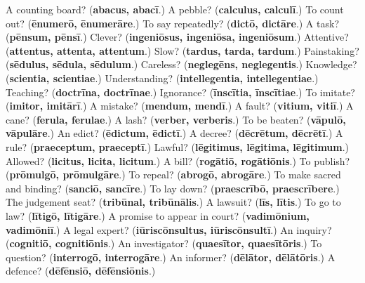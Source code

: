 \begin{tcolorbox}[breakable,colback=teal!4,colframe=teal!35!black,title={Before you move on}]
A counting board? (\textbf{abacus, abacī}.) A pebble? (\textbf{calculus, calculī}.) To count out? (\textbf{ēnumerō, ēnumerāre}.) To say repeatedly? (\textbf{dictō, dictāre}.) A task? (\textbf{pēnsum, pēnsī}.) Clever? (\textbf{ingeniōsus, ingeniōsa, ingeniōsum}.) Attentive? (\textbf{attentus, attenta, attentum}.) Slow? (\textbf{tardus, tarda, tardum}.) Painstaking? (\textbf{sēdulus, sēdula, sēdulum}.) Careless? (\textbf{neglegēns, neglegentis}.) Knowledge? (\textbf{scientia, scientiae}.) Understanding? (\textbf{intellegentia, intellegentiae}.) Teaching? (\textbf{doctrīna, doctrīnae}.) Ignorance? (\textbf{īnscītia, īnscītiae}.) To imitate? (\textbf{imitor, imitārī}.) A mistake? (\textbf{mendum, mendī}.) A fault? (\textbf{vitium, vitiī}.) A cane? (\textbf{ferula, ferulae}.) A lash? (\textbf{verber, verberis}.) To be beaten? (\textbf{vāpulō, vāpulāre}.) An edict? (\textbf{ēdictum, ēdictī}.) A decree? (\textbf{dēcrētum, dēcrētī}.) A rule? (\textbf{praeceptum, praeceptī}.) Lawful? (\textbf{lēgitimus, lēgitima, lēgitimum}.) Allowed? (\textbf{licitus, licita, licitum}.) A bill? (\textbf{rogātiō, rogātiōnis}.) To publish? (\textbf{prōmulgō, prōmulgāre}.) To repeal? (\textbf{abrogō, abrogāre}.) To make sacred and binding? (\textbf{sanciō, sancīre}.) To lay down? (\textbf{praescrībō, praescrībere}.) The judgement seat? (\textbf{tribūnal, tribūnālis}.) A lawsuit? (\textbf{līs, lītis}.) To go to law? (\textbf{lītigō, lītigāre}.) A promise to appear in court? (\textbf{vadimōnium, vadimōniī}.) A legal expert? (\textbf{iūriscōnsultus, iūriscōnsultī}.) An inquiry? (\textbf{cognitiō, cognitiōnis}.) An investigator? (\textbf{quaesītor, quaesītōris}.) To question? (\textbf{interrogō, interrogāre}.) An informer? (\textbf{dēlātor, dēlātōris}.) A defence? (\textbf{dēfēnsiō, dēfēnsiōnis}.)
\end{tcolorbox}
